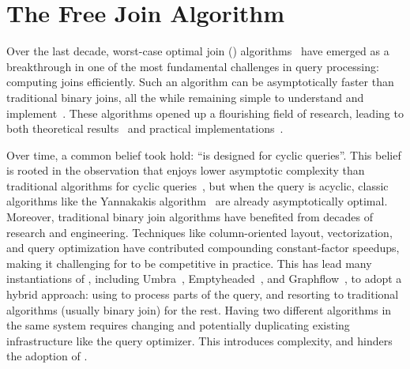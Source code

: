 \chapter{The Free Join Algorithm}
\label{chap:free-join}

Over the last decade, worst-case optimal join (\WCOJ)
algorithms~\cite{DBLP:conf/pods/NgoPRR12, DBLP:conf/icdt/Veldhuizen14,
  DBLP:journals/sigmod/NgoRR13, DBLP:conf/pods/000118} have emerged as
a breakthrough in one of the most fundamental challenges in query
processing: computing joins efficiently.  Such an algorithm can be
asymptotically faster than traditional binary joins, all the while
remaining simple to understand and
implement~\cite{DBLP:journals/sigmod/NgoRR13}.  These algorithms 
opened up a flourishing field of research, leading to both theoretical
results~\cite{DBLP:journals/sigmod/NgoRR13,DBLP:conf/pods/Khamis0S17}
and practical
implementations~\cite{DBLP:conf/icdt/Veldhuizen14,DBLP:journals/tods/AbergerLTNOR17,DBLP:journals/pvldb/FreitagBSKN20, DBLP:journals/pvldb/MhedhbiS19}.

Over time, a common belief took hold: 
  ``\WCOJ is designed for cyclic queries''.
This belief is rooted in the observation that 
  \WCOJ enjoys lower asymptotic complexity 
  than traditional algorithms for cyclic queries~\cite{DBLP:journals/sigmod/NgoRR13}, 
  but when the query is acyclic, 
  classic algorithms like the Yannakakis algorithm~\cite{DBLP:conf/vldb/Yannakakis81} 
  are already asymptotically optimal. 
Moreover, traditional binary join algorithms have benefited from 
  decades of research and engineering.
Techniques like column-oriented layout, vectorization, 
  and query optimization
  have contributed compounding constant-factor speedups,
  making it challenging for \WCOJ to be competitive in practice.
This has lead many instantiations of \WCOJ,
  including Umbra~\cite{DBLP:journals/pvldb/FreitagBSKN20},
   Emptyheaded~\cite{DBLP:journals/tods/AbergerLTNOR17}, and Graphflow~\cite{DBLP:journals/pvldb/MhedhbiS19},
  to adopt a hybrid approach: 
  using \WCOJ to process parts of the query,
  and resorting to traditional algorithms (usually binary join) 
  for the rest.
Having two different algorithms in the same system
  requires changing and potentially duplicating existing infrastructure 
  like the query optimizer. 
This introduces complexity, and hinders the adoption of \WCOJ.

